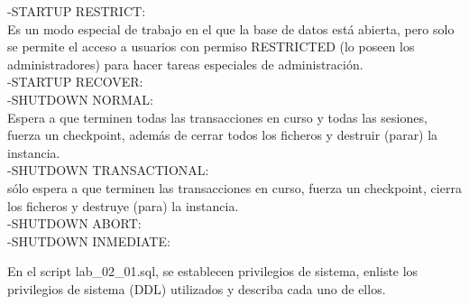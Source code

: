     -STARTUP RESTRICT:\\
    Es un modo especial de trabajo en el que la base de datos está abierta, pero solo se permite el acceso a usuarios 
    con permiso RESTRICTED (lo poseen los administradores) para hacer tareas especiales de administración.\\
    
    -STARTUP RECOVER:\\
    
    
    -SHUTDOWN NORMAL:\\
    Espera a que terminen todas las transacciones en curso y todas las sesiones, 
    fuerza un checkpoint, además de cerrar todos los ficheros y destruir (parar) la instancia.\\
    
    -SHUTDOWN TRANSACTIONAL:\\
    sólo espera a que terminen las transacciones en curso, fuerza un checkpoint, cierra los ficheros y destruye (para) la instancia.\\
    
    -SHUTDOWN ABORT:\\
    
    -SHUTDOWN INMEDIATE:\\
    
   \item En el script lab_02_01.sql, se establecen privilegios de sistema, enliste los privilegios de sistema (DDL) 
   utilizados y describa cada uno de ellos.\\
   
